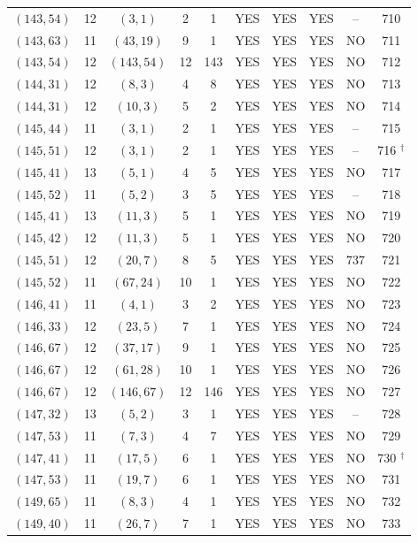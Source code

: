 \begin{longtable}{|c|c|c|c|c|c|c|c|c|c|}
$(143, 54)$ & 12 & $(3, 1)$ & 2 & 1 & YES & YES & YES & -- & 710\\
$(143, 63)$ & 11 & $(43, 19)$ & 9 & 1 & YES & YES & YES & NO & 711\\
$(143, 54)$ & 12 & $(143, 54)$ & 12 & 143 & YES & YES & YES & NO & 712\\
$(144, 31)$ & 12 & $(8, 3)$ & 4 & 8 & YES & YES & YES & NO & 713\\
$(144, 31)$ & 12 & $(10, 3)$ & 5 & 2 & YES & YES & YES & NO & 714\\
$(145, 44)$ & 11 & $(3, 1)$ & 2 & 1 & YES & YES & YES & -- & 715\\
$(145, 51)$ & 12 & $(3, 1)$ & 2 & 1 & YES & YES & YES & -- & 716 ${}^\dagger$\\
$(145, 41)$ & 13 & $(5, 1)$ & 4 & 5 & YES & YES & YES & NO & 717\\
$(145, 52)$ & 11 & $(5, 2)$ & 3 & 5 & YES & YES & YES & -- & 718\\
$(145, 41)$ & 13 & $(11, 3)$ & 5 & 1 & YES & YES & YES & NO & 719\\
$(145, 42)$ & 12 & $(11, 3)$ & 5 & 1 & YES & YES & YES & NO & 720\\
$(145, 51)$ & 12 & $(20, 7)$ & 8 & 5 & YES & YES & YES & 737 & 721\\
$(145, 52)$ & 11 & $(67, 24)$ & 10 & 1 & YES & YES & YES & NO & 722\\
$(146, 41)$ & 11 & $(4, 1)$ & 3 & 2 & YES & YES & YES & NO & 723\\
$(146, 33)$ & 12 & $(23, 5)$ & 7 & 1 & YES & YES & YES & NO & 724\\
$(146, 67)$ & 12 & $(37, 17)$ & 9 & 1 & YES & YES & YES & NO & 725\\
$(146, 67)$ & 12 & $(61, 28)$ & 10 & 1 & YES & YES & YES & NO & 726\\
$(146, 67)$ & 12 & $(146, 67)$ & 12 & 146 & YES & YES & YES & NO & 727\\
$(147, 32)$ & 13 & $(5, 2)$ & 3 & 1 & YES & YES & YES & -- & 728\\
$(147, 53)$ & 11 & $(7, 3)$ & 4 & 7 & YES & YES & YES & NO & 729\\
$(147, 41)$ & 11 & $(17, 5)$ & 6 & 1 & YES & YES & YES & NO & 730 ${}^\dagger$\\
$(147, 53)$ & 11 & $(19, 7)$ & 6 & 1 & YES & YES & YES & NO & 731\\
$(149, 65)$ & 11 & $(8, 3)$ & 4 & 1 & YES & YES & YES & NO & 732\\
$(149, 40)$ & 11 & $(26, 7)$ & 7 & 1 & YES & YES & YES & NO & 733\\

\end{longtable}
